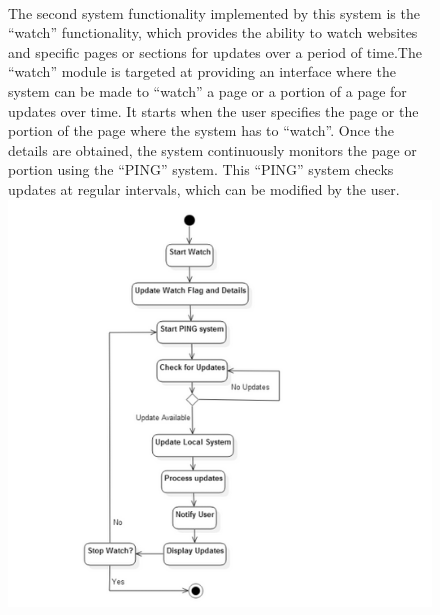 \documentclass[a4paper]{report}
\begin{document}
\begin{figure}
\paragraph{}
\large\textnormal{The second system functionality implemented by this system is the “watch” functionality, which provides the ability to watch websites and specific pages or sections for updates over a period of time.The “watch” module is targeted at providing an interface where the system can be made to “watch” a page or a portion of a page for updates over time. It starts when the user specifies the page or the portion of the page where the system has to “watch”. Once the details are obtained, the system continuously monitors the page or portion using the “PING” system. This “PING” system checks updates at regular intervals, which can be modified by the user.}
\center
\includegraphics[width=5in]{watchdfd.png} 
\end{figure}
\end{document}
